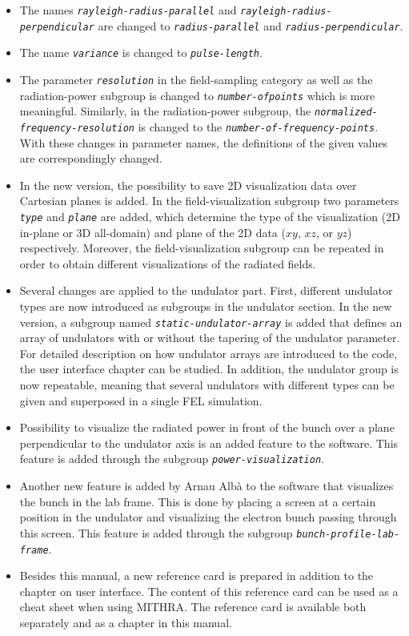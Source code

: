 \begin{itemize}
	\item The names {\tt \em \small rayleigh-radius-parallel} and {\tt \em \small rayleigh-radius-perpendicular} are changed to {\tt \em \small radius-parallel} and {\tt \em \small radius-perpendicular}.
	\item The name {\tt \em \small variance} is changed to {\tt \em \small pulse-length}.
	\item The parameter {\tt \em \small resolution} in the field-sampling category as well as the radiation-power subgroup is changed to {\tt \em \small number-of\-points} which is more meaningful. Similarly, in the radiation-power subgroup, the {\tt \em \small normalized-frequency-resolution} is changed to the {\tt \em \small number-of-frequency-points}. With these changes in parameter names, the definitions of the given values are correspondingly changed.
	\item In the new version, the possibility to save 2D visualization data over Cartesian planes is added. In the field-visualization subgroup two parameters {\tt \em \small type} and {\tt \em \small plane} are added, which determine the type of the visualization (2D in-plane or 3D all-domain) and plane of the 2D data ($xy$, $xz$, or $yz$) respectively. Moreover, the field-visualization subgroup can be repeated in order to obtain different visualizations of the radiated fields.
	\item Several changes are applied to the undulator part. First, different undulator types are now introduced as subgroups in the undulator section. In the new version, a subgroup named {\em \tt \small static-undulator-array} is added that defines an array of undulators with or without the tapering of the undulator parameter. For detailed description on how undulator arrays are introduced to the code, the user interface chapter can be studied. In addition, the undulator group is now repeatable, meaning that several undulators with different types can be given and superposed in a single FEL simulation.
	\item Possibility to visualize the radiated power in front of the bunch over a plane perpendicular to the undulator axis is an added feature to the software. This feature is added through the subgroup {\tt \em \small power-visualization}.
	\item Another new feature is added by Arnau Alb\`{a} to the software that visualizes the bunch in the lab frame. This is done by placing a screen at a certain position in the undulator and visualizing the electron bunch passing through this screen. This feature is added through the subgroup {\tt \em \small bunch-profile-lab-frame}.
	\item Besides this manual, a new reference card is prepared in addition to the chapter on user interface. The content of this reference card can be used as a cheat sheet when using MITHRA. The reference card is available both separately and as a chapter in this manual. 
\end{itemize}
